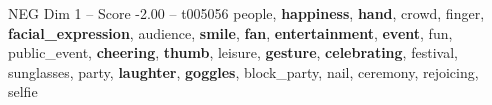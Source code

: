 \begin{textsample}{NEG Dim 1 – Score -2.00 – t005056}  \label{ex:f1_neg_007}
people, \textbf{happiness}, \textbf{hand}, crowd, finger, \textbf{facial\_expression}, audience, \textbf{smile}, \textbf{fan}, \textbf{entertainment}, \textbf{event}, fun, public\_event, \textbf{cheering}, \textbf{thumb}, leisure, \textbf{gesture}, \textbf{celebrating}, festival, sunglasses, party, \textbf{laughter}, \textbf{goggles}, block\_party, nail, ceremony, rejoicing, selfie

\end{textsample}
